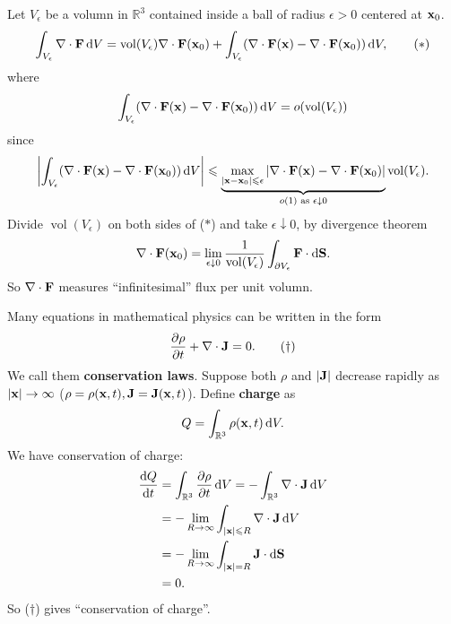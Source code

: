 \begin{example}
    Let $ V_\epsilon $ be a volumn in $ \mathbb{R}^{3} $ contained inside a ball of radius $ \epsilon>0 $ centered at $ {\bf x}_0 $.
    \[
        \int_{V_{\epsilon}} \nabla\cdot {\bf F} \,\mathrm{d}V = \operatorname{vol}(V_\epsilon)\nabla\cdot{\bf F}({\bf x}_0)+\int_{V_\epsilon} (\nabla\cdot{\bf F}({\bf x})-\nabla\cdot{\bf F}({\bf x}_0)) \,\mathrm{d}V,\tag{$*$}
    \]
    where 
    \[
        \int_{V_\epsilon} (\nabla\cdot{\bf F}({\bf x})-\nabla\cdot{\bf F}({\bf x}_0)) \,\mathrm{d}V= o(\operatorname{vol}(V_\epsilon) )
    \]
    since 
    \[
        \left| \int_{V_\epsilon} (\nabla\cdot{\bf F}({\bf x})-\nabla\cdot{\bf F}({\bf x}_0)) \,\mathrm{d}V \right| \leqslant \underbrace{\max_{|{\bf x}-{\bf x}_0|\leqslant \epsilon} \left| \nabla\cdot{\bf F}({\bf x})-\nabla\cdot{\bf F}({\bf x}_0) \right|}_{o(1) \text{ as }\epsilon \downarrow 0} \operatorname{vol}(V_\epsilon) .
    \]
    Divide $ \operatorname{vol}(V_\epsilon)  $ on both sides of ($\ast$) and take $ \epsilon \downarrow 0 $, by divergence theorem 
    \[
        \nabla\cdot {\bf F}({\bf x}_0) = \lim_{\epsilon \downarrow 0} \frac{1}{\operatorname{vol}(V_\epsilon) }  \int_{\partial V_{\epsilon}} {\bf F} \cdot\mathrm{d}\mathbf{S}.
    \]
    So $ \nabla\cdot{\bf F} $ measures ``infinitesimal'' flux per unit volumn.
\end{example}
\begin{example}
    Many equations in mathematical physics can be written in the form 
    \[
        \frac{\partial \rho}{\partial t}+ \nabla\cdot {\bf J} = 0. \tag{$ \dagger $}
    \]
    We call them \textbf{conservation laws}. Suppose both $ \rho $ and $ |{\bf J}| $ decrease rapidly as $ |{\bf x}|\to \infty $ ($ \rho=\rho({\bf x},t),{\bf J}={\bf J}({\bf x},t) $). Define \textbf{charge} as 
    \[
        Q = \int_{\mathbb{R}^{3}} \rho({\bf x},t) \,\mathrm{d}V.
    \]
    We have conservation of charge: 
    \begin{align*}
        \frac{\mathrm{d}Q}{\mathrm{d}t} &=  \int_{\mathbb{R}^{3}} \frac{\partial \rho}{\partial t}  \,\mathrm{d}V = -\int_{\mathbb{R}^{3}} \nabla\cdot{\bf J} \,\mathrm{d}V\\ 
        &= - \lim_{R \to \infty} \int_{|{\bf x}|\leqslant R} \nabla\cdot{\bf J} \,\mathrm{d}V\\ 
        &= - \lim_{R \to \infty} \int_{|{\bf x}|=R} {\bf J} \cdot\mathrm{d}\mathbf{S}\\ 
        &= 0.
    \end{align*}
    So ($ \dagger $) gives ``conservation of charge''.
\end{example} 

